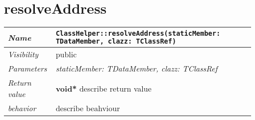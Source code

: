  \section{resolveAddress}
\begin{longtable}{p{3cm} @{\hskip 1cm} p{12cm}}
 \hline
\textit{Name} & \texttt{ClassHelper::resolveAddress(staticMember: TDataMember, clazz: TClassRef)}\\
\hline
 \textit{Visibility} & public\\
\hline
\textit{Parameters} & \textit{staticMember: TDataMember, clazz: TClassRef}\\
\hline
\textit{Return value} & \textbf{ void*} describe return value\\
  \hline
 \textit{behavior} & describe beahviour \\
\hline
\end{longtable} \pagebreak
 